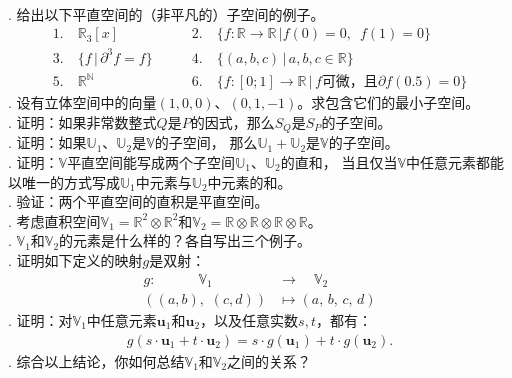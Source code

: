 \documentclass[12pt,UTF8]{ctexbook}
\begin{document}
\begin{xt}
    \mbox{} \\
    . 给出以下平直空间的（非平凡的）子空间的例子。
    $$
    \begin{array}{ll}
        1. \quad \mathbb{R}_3[x] & \qquad 2. \quad \{f: \mathbb{R} \rightarrow \mathbb{R} \, | f(0) = 0, \,\,\, f(1) = 0\} \\
        3. \quad \{f \, | \, \partial^3 f = f\} & \qquad 4. \quad \{(a, b, c) \, | \, a, b, c \in \mathbb{R}\} \\
        5. \quad \mathbb{R}^\mathbb{N} & \qquad 6. \quad \{f: [0;1] \rightarrow \mathbb{R} \, | \, f \mbox{可微，且} \partial f(0.5) = 0\}
    \end{array}
    $$
    . 设有立体空间中的向量$(1, 0, 0)$、$(0, 1, -1)$。求包含它们的最小子空间。\\
    . 证明：如果非常数整式$Q$是$P$的因式，那么$S_Q$是$S_P$的子空间。\\
    . 证明：如果$\mathbb{U}_1$、$\mathbb{U}_2$是$\mathbb{V}$的子空间，
    那么$\mathbb{U}_1 + \mathbb{U}_2$是$\mathbb{V}$的子空间。\\
    . 证明：$\mathbb{V}$平直空间能写成两个子空间$\mathbb{U}_1$、$\mathbb{U}_2$的直和，
    当且仅当$\mathbb{V}$中任意元素都能以唯一的方式写成$\mathbb{U}_1$中元素与$\mathbb{U}_2$中元素的和。\\
    . 验证：两个平直空间的直积是平直空间。\\
    . 考虑直积空间$\mathbb{V}_1 = \mathbb{R}^2\otimes \mathbb{R}^2$和$\mathbb{V}_2 = \mathbb{R}\otimes \mathbb{R}\otimes \mathbb{R}\otimes \mathbb{R}$。\\
    . $\mathbb{V}_1$和$\mathbb{V}_2$的元素是什么样的？各自写出三个例子。\\
    . 证明如下定义的映射$g$是双射：
    \begin{align*}
        g:\quad \qquad \mathbb{V}_1 \qquad &\rightarrow \quad \mathbb{V}_2 \\
        ((a,b), \,\, (c,d)) &\mapsto (a, \,b, \,c, \,d)
    \end{align*}
    . 证明：对$\mathbb{V}_1$中任意元素$\mathbf{u}_1$和$\mathbf{u}_2$，以及任意实数$s, t$，都有：
    \begin{align*}
        g(s\cdot \mathbf{u}_1 + t\cdot \mathbf{u}_2) = s\cdot g(\mathbf{u}_1) + t\cdot g(\mathbf{u}_2).
    \end{align*}
    . 综合以上结论，你如何总结$\mathbb{V}_1$和$\mathbb{V}_2$之间的关系？\\
\end{xt}
\end{document}
